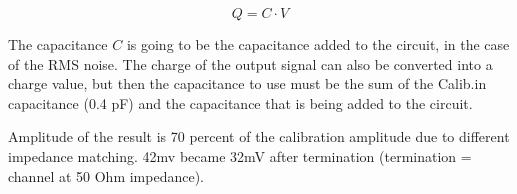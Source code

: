 \documentclass[12pt]{article}
\begin{document}
\begin{equation}
  Q = C\cdot V
\end{equation}

The capacitance $C$ is going to be the capacitance added to the circuit, in the case of the RMS noise. The charge of the output signal can also be converted into a charge value, but then the capacitance to use must be the sum of the Calib.in capacitance (0.4 pF) and the capacitance that is being added to the circuit.

Amplitude of the result is 70 percent of the calibration amplitude due to different impedance matching.
42mv became 32mV after termination (termination = channel at 50 Ohm impedance).
\end{document}
